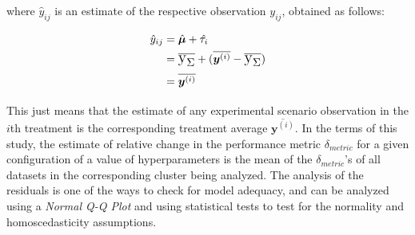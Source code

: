 where $\hat{y}_{ij}$ is an estimate of the respective observation $y_{ij}$, obtained as follows:

\begin{equation}    
    \begin{split}
        \hat{y}_{ij} & = \hat{\bm{\mu}} + \hat{\tau_i}\\
        & = \text{\Large$\overline{\text{\textup{y}}_\Sigma}$} + (\overline{\bm{y}^{(i)}} - \text{\Large$\overline{\text{\textup{y}}_\Sigma}$})\\
        & = \overline{\bm{y}^{(i)}}
    \end{split}
\end{equation}

This just means that the estimate of any experimental scenario observation in the $i$th treatment is the corresponding treatment average $\overline{\bm{y}^{(i)}}$. In the terms of this study, the estimate of relative change in the performance metric $\delta_{metric}$ for a given configuration of a value of hyperparameters is the mean of the $\delta_{metric}$'s of all datasets in the corresponding cluster being analyzed. The analysis of the residuals is one of the ways to check for model adequacy, and can be analyzed using a \textit{Normal Q-Q Plot} and using statistical tests to test for the normality and homoscedasticity assumptions.

